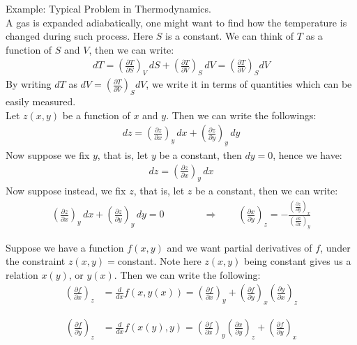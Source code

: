 \documentclass[11pt,oneside]{book}
\theoremstyle{break}
\theoremstyle{break}
\newcommand{\example}{\color{green}Example: \color{black}}
\begin{document}
\example Typical Problem in Thermodynamics.\\
A gas is expanded adiabatically, one might want to find how the temperature is changed during such process. Here $S$ is a constant. We can think of $T$ as a function of $S$ and $V$, then we can write:
\begin{align*}
dT = \left( \frac{\partial T}{\partial S} \right)_V \, dS + \left( \frac{\partial T}{\partial V}\right)_S \, dV = \left( \frac{\partial T}{\partial V}\right)_S dV
\end{align*}
By writing $dT$ as $dV = \left( \frac{\partial T}{\partial V}\right)_S dV$, we write it in terms of quantities which can be easily measured. \\
\hfill\break
\hfill\break
Let $z(x,y)$ be a function of $x$ and $y$. Then we can write the followings:
\begin{align*}
dz = \left( \frac{\partial z}{\partial x}\right)_y \, dx + \left( \frac{\partial z}{\partial y}\right)_y \, dy
\end{align*}
Now suppose we fix $y$, that is, let $y$ be a constant, then $dy = 0$, hence we have:
\begin{align*}
dz = \left( \frac{\partial z}{\partial x}\right)_y \, dx 
\end{align*}
Now suppose instead, we fix $z$, that is, let $z$ be a constant, then we can write:
\begin{align*}
 \left( \frac{\partial z}{\partial x}\right)_y \, dx + \left( \frac{\partial z}{\partial y}\right)_y \, dy = 0 \qquad \qquad \Rightarrow \qquad \left( \frac{\partial x}{\partial y}\right)_z = - \frac{\left(\frac{\partial z}{\partial y} \right)_x}{\left(\frac{\partial z}{\partial x}\right)_y}
\end{align*}

Suppose we have a function $f(x,y)$ and we want partial derivatives of $f$, under the constraint $z(x,y) = $constant. Note here $z(x,y)$ being constant gives us a relation $x(y)$, or $y(x)$. Then we can write the following:
\begin{align*}
\left( \frac{\partial f}{\partial x}\right)_z &= \frac{d}{dx}f(x,y(x)) = \left( \frac{\partial f}{\partial x}\right)_y + \left( \frac{\partial f}{\partial y}\right)_x \left( \frac{\partial y}{\partial x}\right)_z 
\end{align*}

\begin{align*}
\left( \frac{\partial f}{\partial y}\right)_z &= \frac{d}{dx}f(x(y),y) = \left( \frac{\partial f}{\partial x}\right)_y \left( \frac{\partial x}{\partial y}\right)_z + \left( \frac{\partial f}{\partial y}\right)_x 
\end{align*}
\end{document}
